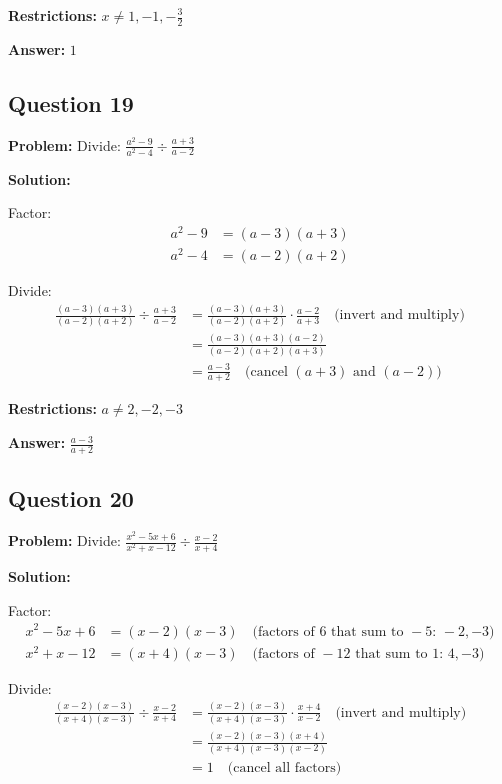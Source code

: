 \documentclass[12pt]{article}
\begin{document}
\textbf{Restrictions:} $x \neq 1, -1, -\frac{3}{2}$

\textbf{Answer:} $\boxed{1}$

\subsection*{Question 19}
\textbf{Problem:} Divide: $\frac{a^2-9}{a^2-4} \div \frac{a+3}{a-2}$

\textbf{Solution:}

Factor:
\begin{align*}
a^2 - 9 &= (a-3)(a+3) \\
a^2 - 4 &= (a-2)(a+2)
\end{align*}

Divide:
\begin{align*}
\frac{(a-3)(a+3)}{(a-2)(a+2)} \div \frac{a+3}{a-2} &= \frac{(a-3)(a+3)}{(a-2)(a+2)} \cdot \frac{a-2}{a+3} \quad \text{(invert and multiply)} \\
&= \frac{(a-3)(a+3)(a-2)}{(a-2)(a+2)(a+3)} \\
&= \frac{a-3}{a+2} \quad \text{(cancel } (a+3) \text{ and } (a-2) \text{)}
\end{align*}

\textbf{Restrictions:} $a \neq 2, -2, -3$

\textbf{Answer:} $\boxed{\frac{a-3}{a+2}}$

\subsection*{Question 20}
\textbf{Problem:} Divide: $\frac{x^2-5x+6}{x^2+x-12} \div \frac{x-2}{x+4}$

\textbf{Solution:}

Factor:
\begin{align*}
x^2 - 5x + 6 &= (x-2)(x-3) \quad \text{(factors of } 6 \text{ that sum to } -5 \text{: } -2, -3 \text{)} \\
x^2 + x - 12 &= (x+4)(x-3) \quad \text{(factors of } -12 \text{ that sum to } 1 \text{: } 4, -3 \text{)}
\end{align*}

Divide:
\begin{align*}
\frac{(x-2)(x-3)}{(x+4)(x-3)} \div \frac{x-2}{x+4} &= \frac{(x-2)(x-3)}{(x+4)(x-3)} \cdot \frac{x+4}{x-2} \quad \text{(invert and multiply)} \\
&= \frac{(x-2)(x-3)(x+4)}{(x+4)(x-3)(x-2)} \\
&= 1 \quad \text{(cancel all factors)}
\end{align*}
\end{document}

